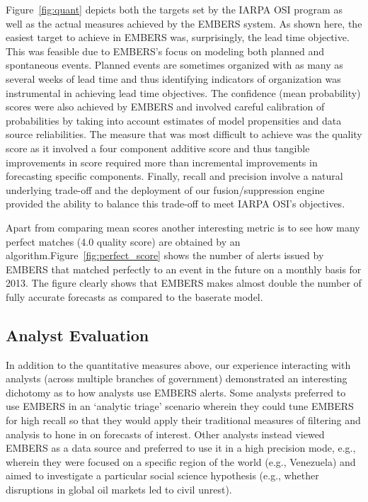 Figure~\ref{fig:quant} depicts both the targets set by the IARPA OSI program as well as the
actual measures achieved by the EMBERS system. As shown here, the easiest target to achieve
in EMBERS was, surprisingly, the lead time objective. This was feasible due to EMBERS's focus on modeling
both planned and spontaneous events. Planned events are sometimes organized with as many as several weeks
of lead time and thus identifying indicators of organization was instrumental in achieving
lead time objectives. The confidence (mean probability) scores were also achieved by EMBERS and involved
careful calibration of probabilities by taking into account estimates of
model propensities and data source reliabilities. The measure that was most difficult to achieve
was the quality score as it involved a four component additive score and thus tangible improvements in
score required more than incremental improvements in forecasting specific components. Finally, recall
and precision involve a natural underlying trade-off and the deployment of our fusion/suppression
engine provided the ability to balance this trade-off to meet IARPA OSI's objectives.

Apart from comparing mean scores another interesting metric is to see
how many perfect matches (4.0 quality score) are obtained by an
algorithm.Figure~\ref{fig:perfect_score} shows the number of alerts issued
by EMBERS that matched perfectly to an event in the future on a monthly
basis for 2013.  The figure clearly shows that EMBERS makes almost double
the number of fully accurate forecasts as compared to the baserate
model.


\subsection{Analyst Evaluation}
In addition to the quantitative measures above, our experience interacting with analysts (across multiple
branches of government) demonstrated
an interesting dichotomy as to how analysts use EMBERS alerts. Some analysts preferred to use EMBERS in an
`analytic triage' scenario wherein they could tune EMBERS for high recall so that they would apply their
traditional measures of filtering and analysis to hone in on forecasts of interest. Other analysts
instead viewed EMBERS as a data source and preferred to use it in a high precision mode, e.g., wherein they
were focused on a specific region of the world (e.g., Venezuela) and aimed to investigate a particular
social science hypothesis (e.g., whether disruptions in global oil markets led to civil unrest).

